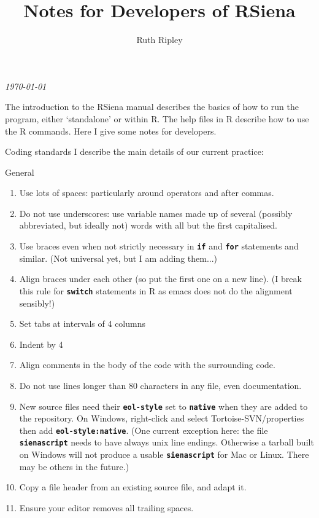 \documentclass[12pt, a4paper]{article}
\makeatletter
\renewcommand{\=}{\,=\,}
\newcommand{\+}{\,+\,}
\newcommand{\sfn}[1]{\textbf{\texttt{#1}}}
\renewcommand{\section}{\@startsection{section}{1}
                {0pt}{\baselineskip}{0.5\baselineskip}
                {\centering\sffamily} }
\renewcommand{\subsection}{\@startsection{subsection}{2}
                {0pt}{0.7\baselineskip}{0.3\baselineskip}
                {\sffamily} }
\makeatother
\begin{document}
\title{Notes for Developers of RSiena}
\author{Ruth Ripley}
\date{}
\maketitle

\centerline{\emph{\today}}
\bigskip

The introduction to the RSiena manual describes the basics of how to run the
program, either `standalone' or within R. The help files in R describe how to
use the R commands. Here I give some notes for developers.
\section{Coding standards}
I describe the main details of our current practice:
\subsection{General}
\begin{enumerate}
\item Use lots of spaces: particularly around operators and after commas.
\item Do not use underscores: use variable names made up of several (possibly
  abbreviated, but ideally not) words with all but the first capitalised.
\item Use braces even when not strictly necessary in \sfn{if} and \sfn{for}
  statements and similar. (Not universal yet, but I am adding them...)
\item Align braces under each other (so put the first one on a new line). (I
  break this rule for \sfn{switch} statements in R as emacs does not do the
  alignment sensibly!)
\item Set tabs at intervals of 4 columns
\item Indent by 4
\item Align comments in the body of the code with the surrounding code.
\item Do not use lines longer than 80 characters in any file, even
  documentation. 
\item New source files need their \sfn{eol-style} set to \sfn{native} when they
  are added to the repository. On Windows, right-click and select
  Tortoise-SVN/properties then add \sfn{eol-style:native}.  (One current
  exception here: the file \sfn{sienascript} needs to have always unix line
  endings. Otherwise a tarball built on Windows will not produce a usable
  \sfn{sienascript} for Mac or Linux. There may be others in the future.)
\item Copy a file header from an existing source file, and adapt it.
\item Ensure your editor removes all trailing spaces.
\end{enumerate}
\end{document}
